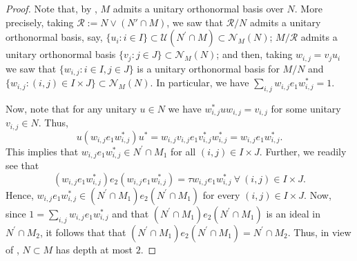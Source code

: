 \documentclass{amsart}
\theoremstyle{definition}
\theoremstyle{theorem}
\begin{document}
\begin{proof}
  Note that, by , $M$ admits a unitary
  orthonormal basis over $N$. More precisely, taking $\mathcal{R}:=N
  \vee (N'\cap M)$, we saw that $\mathcal{R}/N$ admits a unitary
  orthonormal basis, say, $\{u_i:i\in I\}\subset
  \mathcal{U}(N^{\prime}\cap M)\subset \mathcal{N}_M(N)$;
  $M/\mathcal{R}$ admits a unitary orthonormal basis $\{v_j:j\in
  J\}\subset \mathcal{N}_M(N)$; and then, taking $w_{i,j}=v_ju_i$ we
  saw that $\{w_{i,j}:i\in I, j\in J\}$ is a unitary orthonormal basis
  for $M/N$ and $\{w_{i,j}: (i, j) \in I \times J\}\subset
  \mathcal{N}_M(N).$ In particular, we have $\sum_{i,j}
  w_{i,j}e_1w^*_{i,j}=1.$

 Now, note that for any unitary $u\in N$ we have
 $w^*_{i,j}uw_{i,j}=v_{i,j}$ for some unitary $v_{i,j}\in
 N$. Thus,
 \[
 u(w_{i,j}e_1w^*_{i,j})u^*=w_{i,j}v_{i,j}e_1v^*_{i,j}w^*_{i,j}=
 w_{i,j}e_1w^*_{i,j}.
 \]
 This implies that  $w_{i,j}e_1w^*_{i,j}\in N^{\prime}\cap
 M_1$ for all $(i,j)\in I\times J$. Further, we readily see that
 \[
 (w_{i,j}e_1w^*_{i,j})e_2(w_{i,j}e_1w^*_{i,j})=\tau
 w_{i,j}e_1w^*_{i,j} \ \forall\ (i, j) \in I \times J.
 \]
 Hence, $w_{i,j}e_1w^*_{i,j}\in (N^{\prime}\cap M_1)e_2
 (N^{\prime}\cap M_1)$ for every $(i,j)\in I\times J$. Now, since
 $1=\sum_{i,j} w_{i,j}e_1w^*_{i,j}$ and that $(N^{\prime}\cap
 M_1)e_2(N^{\prime}\cap M_1)$ is an ideal in $N^{\prime}\cap M_2$, it
 follows that that $(N^{\prime}\cap M_1)e_2 (N^{\prime}\cap
 M_1)=N^{\prime}\cap M_2.$ Thus, in view of \cite[Theorem 4.6.3]{GHJ}, $N \subset M$ has depth at most $2$.
\end{proof}
\end{document}
